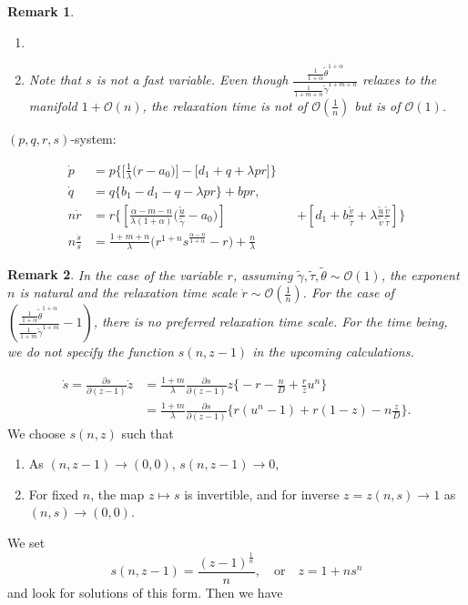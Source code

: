 \documentclass[a4paper,11pt]{article}
\def\tg{{\tilde{\gamma}}}
\def\tv{{\tilde{v}}}
\def\tth{{\tilde{\theta}}}
\def\ts{{\tilde{\tau}}}
\def\tu{{\tilde{u}}}
\def\dpp{\dot{p}}
\def\dqq{\dot{q}}
\def\drr{\dot{r}}
\newtheorem{remark}{Remark}[section]
\begin{document}
\begin{remark}
 \begin{enumerate}
  \item 
  \item Note that $s$ is not a fast variable. Even though $\displaystyle\frac{ \frac{1}{1+\alpha} \tth^{1+\alpha} }{ \frac{1}{1+m+n} \tg^{1+m+n} }$ relaxes to the manifold $1 + \mathcal{O}(n)$, the relaxation time is not of $\mathcal{O}(\frac{1}{n})$ but is of $\mathcal{O}(1)$.
  
 \end{enumerate}
\end{remark}



$(p,q,r,s)$-system:

\begin{equation}
\begin{aligned}
  {\dpp}&=p\bigg\{\Big[\frac{1}{\lambda }\Big(r-a_0\Big)\Big] -\Big[d_1 + q + \lambda p r\Big]\bigg\}\\
  {\dqq}&=q\bigg\{b_1-d_1 - q-\lambda p r\bigg\} +bpr,\\
 n{\drr}&=r\bigg\{\left[\frac{\alpha-m-n}{\lambda(1+\alpha) }\Big(\frac{\tu}{\tg}-a_0\Big)\right]& &+\left[d_1 + b\frac{\tv}{\ts} + \lambda\frac{\tu}{\tv}\frac{\tv}{\ts}\right]\bigg\}\\
 n\frac{\dot{s}}{s} &= \frac{1+m+n}{\lambda}\Big(r^{1+n}s^{\frac{\alpha-n}{1+\alpha}} - r \Big) + \frac{n}{\lambda}
\end{aligned}
\end{equation}

\begin{remark}
 In the case of the variable $r$, assuming $\tg, \ts,\tth \sim \mathcal{O}(1)$, the exponent $n$ is natural and the relaxation time scale $\drr \sim \mathcal{O}(\frac{1}{n})$. For the case of $\displaystyle\left(\frac{ \frac{1}{1+\alpha}\tth^{1+\alpha}}{ \frac{1}{1+m}\tg^{1+m} } -1 \right)$, there is no preferred relaxation time scale. For the time being, we do not specify the function $s(n,z-1)$ in the upcoming calculations.
\end{remark}
\begin{align*}
 \dot{s} =\frac{\partial s}{\partial (z-1)} \dot{z}
 &= \frac{1+m}{\lambda}\frac{\partial s}{\partial (z-1)} z\bigg\{-r - \frac{n}{D}+ \frac{r}{z}u^n\bigg\}\\
 &=\frac{1+m}{\lambda}\frac{\partial s}{\partial (z-1)} \bigg\{r(u^n-1) +r(1-z) -n\frac{z}{D}\bigg\}.
\end{align*}
We choose $s(n,z)$ such that
\begin{enumerate}
 \item As $(n,z-1) \rightarrow (0,0)$, $s(n,z-1) \rightarrow 0$, 
 \item For fixed $n$, the map $z \mapsto s$ is invertible, and for inverse $z=z(n,s)\rightarrow 1$ as $(n,s) \rightarrow (0,0)$.
\end{enumerate}
We set 
$$ s(n,z-1) = \frac{(z-1)^{\frac{1}{n}}}{n}, \quad \text{or} \quad z= 1+ns^n$$
and look for solutions of this form. Then we have
\end{document}
